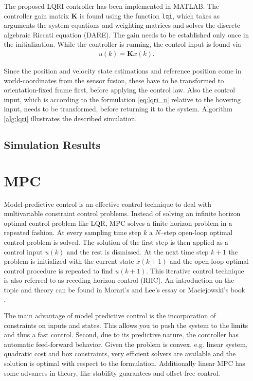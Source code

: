 The proposed LQRI controller has been implemented in MATLAB. The controller gain matrix $\mathbf{K}$ is found using the function \texttt{lqi}, which takes as arguments the system equations and weighting matrices and solves the discrete algebraic Riccati equation (DARE). The gain needs to be established only once in the initialization. While the controller is running, the control input is found via
\begin{align}
u(k) = \mathbf{K} x(k).
\end{align}

Since the position and velocity state estimations and reference position come in world-coordinates from the sensor fusion, these have to be transformed to orientation-fixed frame first, before applying the control law. Also the control input, which is according to the formulation \ref{eq:lqri_u} relative to the hovering input, needs to be transformed, before returning it to the system. Algorithm \ref{alg:lqri} illustrates the described simulation.

\subsection{Simulation Results}
\section{MPC} 
Model predictive control is an effective control technique to deal with multivariable constraint control problems. Instead of solving an infinite horizon optimal control problem like LQR, MPC solves a finite horizon problem in a repeated fashion. At every sampling time step $k$ a $N$--step open-loop optimal control problem is solved. The solution of the first step is then applied as a control input $u(k)$ and the rest is dismissed. At the next time step $k+1$ the problem is initialized with the current state $x(k+1)$ and the open-loop optimal control procedure is repeated to find $u(k+1)$. This iterative control technique is also referred to as receding horizon control (RHC). An introduction on the topic and theory can be found in Morari's and Lee's essay \cite{Morari1999} or Maciejowski's book \cite{Maciejowski2002}.

The main advantage of model predictive control is the incorporation of constraints on inputs and states. This allows you to push the system to the limits and thus a fast control. Second, due to its predictive nature, the controller has automatic feed-forward behavior. Given the problem is convex, e.g. linear system, quadratic cost and box constraints, very efficient solvers are available and the solution is optimal with respect to the formulation. Additionally linear MPC has some advances in theory, like stability guarantees and offset-free control.


